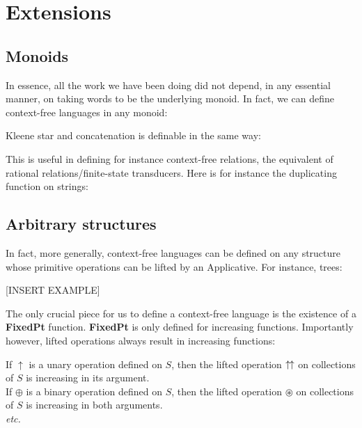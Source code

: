 \section{Extensions}

\subsection{Monoids}

In essence, all the work we have been doing did not depend, in any essential manner, on taking words to be the underlying monoid. In fact, we can define context-free languages in any monoid:



Kleene star and concatenation is definable in the same way:



This is useful in defining for instance context-free relations, the equivalent of rational relations/finite-state transducers. Here is for instance the duplicating function on strings:



\subsection{Arbitrary structures}

In fact, more generally, context-free languages can be defined on any structure whose primitive operations can be lifted by an Applicative. For instance, trees:

[INSERT EXAMPLE]

The only crucial piece for us to define a context-free language is the existence of a \textbf{FixedPt} function. \textbf{FixedPt} is only defined for increasing functions. Importantly however, lifted operations always result in increasing functions:

\begin{prop}
If $\uparrow$ is a unary operation defined on $S$, then the lifted operation $\uparrow\hspace{-1pt}\uparrow$ on collections of $S$ is increasing in its argument.\\
If $\oplus$ is a binary operation defined on $S$, then the lifted operation $\circledast$ on collections of $S$ is increasing in both arguments.\\
\emph{etc.}
\end{prop}






